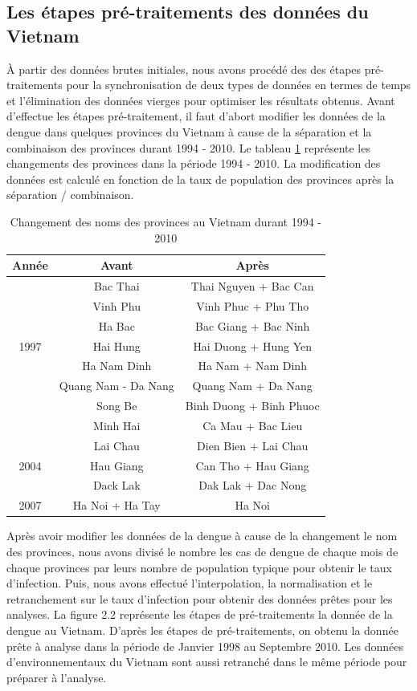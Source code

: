 \subsection {Les étapes pré-traitements des données du Vietnam}

À partir des données brutes initiales, nous avons procédé des des étapes pré-traitements pour la synchronisation de deux types de données en termes de temps et l'élimination des données vierges pour optimiser les résultats obtenus. Avant d'effectue les étapes pré-traitement, il faut d'abort modifier les données de la dengue dans quelques provinces du Vietnam à cause de la séparation et la combinaison des provinces durant 1994 - 2010. Le tableau \ref{table2.2} représente les changements des provinces dans la période 1994 - 2010. La modification des données est calculé en fonction de la taux de population des provinces après la séparation / combinaison. 
\begin{table}[h]
\centering
\begin{tabular} { | c | c | c |}
\hline
Année & Avant & Après  \\
\hline
      	 & Bac Thai & Thai Nguyen + Bac Can\\ 
      	 & Vinh Phu & Vinh Phuc + Phu Tho\\ 
      	 & Ha Bac & Bac Giang + Bac Ninh\\ 
1997 & Hai Hung & Hai Duong + Hung Yen\\ 
      	 & Ha Nam Dinh & Ha Nam + Nam Dinh\\ 
      	 & Quang Nam - Da Nang & Quang Nam + Da Nang\\ 
      	 & Song Be & Binh Duong + Binh Phuoc\\ 
      	 & Minh Hai & Ca Mau + Bac Lieu\\ 

\hline
      	 & Lai Chau & Dien Bien + Lai Chau\\ 
2004 & Hau Giang & Can Tho + Hau Giang\\ 
      	 & Dack Lak & Dak Lak + Dac Nong \\ 
\hline
2007 & Ha Noi + Ha Tay & Ha Noi\\ 
\hline
\end{tabular}
\caption{Changement des noms des provinces au Vietnam durant 1994 - 2010} 
\label{table2.2}
\end{table}
Après avoir modifier les données de la dengue à cause de la changement le nom des provinces, nous avons divisé le nombre les cas de dengue de chaque mois de chaque provinces par leurs nombre de population typique  pour obtenir le taux d'infection. Puis, nous avons effectué l'interpolation, la normalisation et le retranchement sur le taux d'infection pour obtenir des données prêtes pour les analyses. La figure 2.2 représente les étapes de pré-traitements la donnée de la dengue au Vietnam. D'après les étapes de pré-traitements, on obtenu la donnée prête à analyse dans la période de Janvier 1998 au Septembre 2010. Les données d'environnementaux du Vietnam sont aussi retranché dans le même période pour préparer à l'analyse. 
